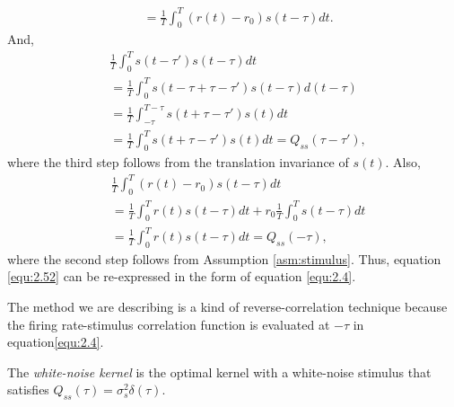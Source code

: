 \begin{solution}
\begin{equation}
\begin{aligned}
      &= \frac{1}{T}\int_0^{T}(r(t)-r_0)s(t-\tau)dt.
    \end{aligned}
  \end{equation}
  And,
  \begin{displaymath}
    \begin{aligned}
      &\frac{1}{T}\int_0^{T}s(t-\tau')s(t-\tau)dt\\
      &= \frac{1}{T}\int_0^{T}s(t-\tau+\tau-\tau')s(t-\tau)d(t-\tau)\\
      &= \frac{1}{T}\int_{-\tau}^{T-\tau}s(t+\tau-\tau')s(t)dt\\
      &= \frac{1}{T}\int_{0}^{T}s(t+\tau-\tau')s(t)dt = Q_{ss}(\tau-\tau'),
    \end{aligned}
  \end{displaymath}
  where the third step follows from the translation invariance of $s(t)$. Also,
  \begin{displaymath}
    \begin{aligned}
      &\frac{1}{T}\int_0^{T}(r(t)-r_0)s(t-\tau)dt\\
      &= \frac{1}{T}\int_0^{T}r(t)s(t-\tau)dt + r_0\frac{1}{T}\int_0^{T}s(t-\tau)dt\\
      &= \frac{1}{T}\int_0^{T}r(t)s(t-\tau)dt = Q_{ss}(-\tau),
    \end{aligned}
  \end{displaymath}
  where the second step follows from Assumption \ref{asm:stimulus}.
  Thus, equation \ref{equ:2.52} can be re-expressed in the form of equation \ref{equ:2.4}.
\end{solution}

\begin{rem}
  The method we are describing is a kind of reverse-correlation technique because the firing rate-stimulus correlation function is evaluated at $-\tau$ in equation\ref{equ:2.4}.
\end{rem}

\begin{defn}
  \label{def:WhiteNoiseKernel}
  The \emph{white-noise kernel} is the optimal kernel with a white-noise stimulus that satisfies $Q_{ss}(\tau) = \sigma_s^2\delta(\tau)$.
\end{defn}


